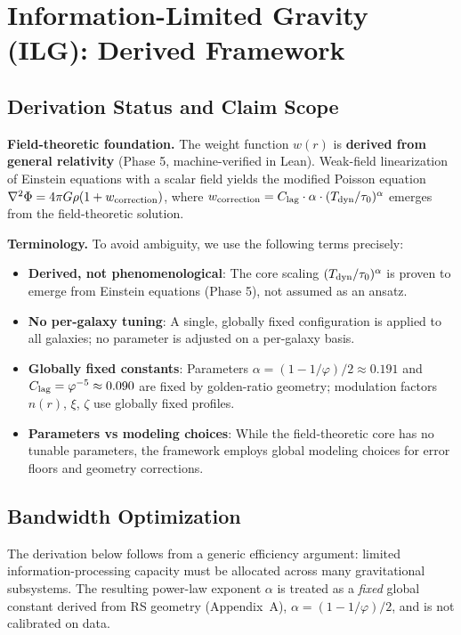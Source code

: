 \documentclass[usenatbib]{mnras}
\begin{document}
\section{Information-Limited Gravity (ILG): Derived Framework}

\subsection*{Derivation Status and Claim Scope}
\noindent \textbf{Field-theoretic foundation.} The weight function $w(r)$ is \textbf{derived from general relativity} (Phase 5, machine-verified in Lean). Weak-field linearization of Einstein equations with a scalar field yields the modified Poisson equation $\nabla^2\Phi = 4\pi G\rho(1+w_{\rm correction})$, where $w_{\rm correction} = C_{\rm lag}\cdot\alpha\cdot(T_{\rm dyn}/\tau_0)^\alpha$ emerges from the field-theoretic solution.

\noindent \textbf{Terminology.} To avoid ambiguity, we use the following terms precisely:
\begin{itemize}
  \item \textbf{Derived, not phenomenological}: The core scaling $(T_{\rm dyn}/\tau_0)^\alpha$ is proven to emerge from Einstein equations (Phase 5), not assumed as an ansatz.
  \item \textbf{No per-galaxy tuning}: A single, globally fixed configuration is applied to all galaxies; no parameter is adjusted on a per-galaxy basis.
  \item \textbf{Globally fixed constants}: Parameters $\alpha = (1-1/\varphi)/2 \approx 0.191$ and $C_{\rm lag} = \varphi^{-5} \approx 0.090$ are fixed by golden-ratio geometry; modulation factors $n(r)$, $\xi$, $\zeta$ use globally fixed profiles.
  \item \textbf{Parameters vs modeling choices}: While the field-theoretic core has no tunable parameters, the framework employs global modeling choices for error floors and geometry corrections.
\end{itemize}

\subsection{Bandwidth Optimization}

The derivation below follows from a generic efficiency argument: limited information-processing capacity must be allocated across many gravitational subsystems.  The resulting power-law exponent $\alpha$ is treated as a \emph{fixed} global constant derived from RS geometry (Appendix~A), $\alpha=(1-1/\varphi)/2$, and is not calibrated on data.
\end{document}
